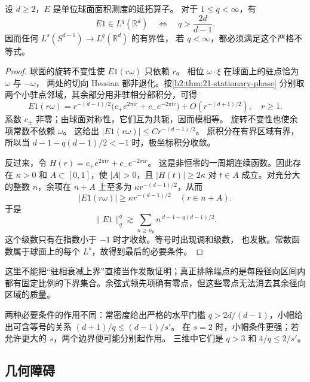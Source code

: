 \begin{proposition}[常密度的严格尾部条件]\label{b2:prop:23-sphere-tail}
设 \(d\geq2\)，\(E\) 是单位球面面积测度的延拓算子。
对于 \(1\leq q<\infty\)，有
\[
 E1\in L^q(\mathbb R^d)
 \quad\Longleftrightarrow\quad
 q>\frac{2d}{d-1}.
\]
因而任何 \(L^s(S^{d-1})\to L^q(\mathbb R^d)\) 的有界性，
若 \(q<\infty\)，都必须满足这个严格不等式。
\end{proposition}
\begin{proof}
球面的旋转不变性使 \(E1(r\omega)\) 只依赖 \(r\)。
相位 \(\omega\cdot\xi\) 在球面上的驻点恰为 \(\omega\) 与 \(-\omega\)，
两处的切向 Hessian 都非退化。按\cref{b2:thm:21-stationary-phase}
分别取两个小驻点邻域，其余部分用非驻相分部积分，可得
\[
 E1(r\omega)=r^{-(d-1)/2}
       \bigl(c_+e^{2\pi\mathrm i r}+c_-e^{-2\pi\mathrm i r}\bigr)
       +O(r^{-(d+1)/2}),\quad r\geq1.
\]
系数 \(c_\pm\) 非零；由球面对称性，它们互为共轭，因而模相等。
旋转不变性也使余项常数不依赖 \(\omega\)。
这给出 \(|E1(r\omega)|\leq Cr^{-(d-1)/2}\)。
原积分在有界区域有界，所以当
\(d-1-q(d-1)/2<-1\) 时，极坐标积分收敛。

反过来，令
\(H(r)=c_+e^{2\pi\mathrm i r}+c_-e^{-2\pi\mathrm i r}\)。
这是非恒零的一周期连续函数。因此存在 \(\kappa>0\) 和
\(A\subset[0,1]\)，使 \(|A|>0\)，且 \(|H(t)|\geq2\kappa\)
对 \(t\in A\) 成立。对充分大的整数 \(n\)，余项在
\(n+A\) 上至多为 \(\kappa r^{-(d-1)/2}\)，从而
\[
 |E1(r\omega)|\geq\kappa r^{-(d-1)/2}
       \quad(r\in n+A).
\]
于是
\[
 \|E1\|_q^q\gtrsim
 \sum_{n\geq n_0} n^{\,d-1-q(d-1)/2}.
\]
这个级数只有在指数小于 \(-1\) 时才收敛。等号时出现调和级数，
也发散。常数函数属于球面上的每个 \(L^s\)，故得到最后的必要条件。
\end{proof}

这里不能把“驻相衰减上界”直接当作发散证明；真正排除端点的是每段径向区间内都有固定比例的下界集合。余弦式领先项确有零点，但这些零点无法消去其余径向区域的质量。

\ProseParagraphBreak
两种必要条件的作用不同：常密度给出严格的水平门槛
\(q>2d/(d-1)\)，小帽给出可含等号的关系
\((d+1)/q\leq(d-1)/s'\)。
在 \(s=2\) 时，小帽条件更强；若允许更大的 \(s\)，两个边界便可能分别起作用。
三维中它们是 \(q>3\) 和 \(4/q\leq2/s'\)。

\subsection{几何障碍}
\label{b2:subsec:230204}

